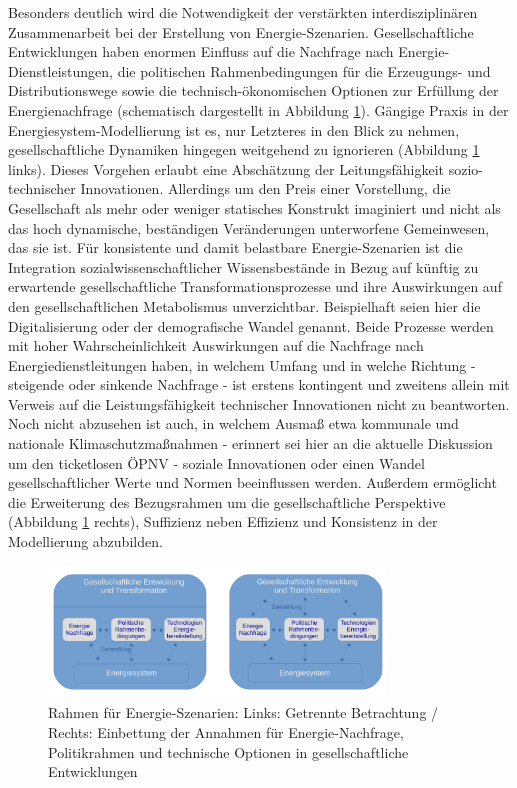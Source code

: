 \documentclass[a4paper,11pt,twoside]{scrartcl}
\begin{document}
Besonders deutlich wird die Notwendigkeit der verstärkten interdisziplinären Zusammenarbeit bei der Erstellung von Energie-Szenarien. Gesellschaftliche Entwicklungen haben enormen Einfluss auf die Nachfrage nach Energie-Dienstleistungen, die politischen Rahmenbedingungen für die Erzeugungs- und Distributionswege sowie die technisch-ökonomischen Optionen zur Erfüllung der Energienachfrage (schematisch dargestellt in Abbildung \ref{fig:szenarien}). Gängige Praxis in der Energiesystem-Modellierung ist es, nur Letzteres in den Blick zu nehmen, gesellschaftliche Dynamiken hingegen weitgehend zu ignorieren (Abbildung \ref{fig:szenarien} links). Dieses Vorgehen erlaubt eine Abschätzung der Leitungsfähigkeit sozio-technischer Innovationen. Allerdings um den Preis einer Vorstellung, die Gesellschaft als mehr oder weniger statisches Konstrukt imaginiert und nicht als das hoch dynamische, beständigen Veränderungen unterworfene Gemeinwesen, das sie ist. Für konsistente und damit belastbare Energie-Szenarien ist die Integration sozialwissenschaftlicher Wissensbestände in Bezug auf künftig zu erwartende gesellschaftliche Transformationsprozesse und ihre Auswirkungen auf den gesellschaftlichen Metabolismus unverzichtbar. Beispielhaft seien hier die Digitalisierung oder der demografische Wandel genannt. Beide Prozesse werden mit hoher Wahrscheinlichkeit Auswirkungen auf die Nachfrage nach Energiedienstleitungen haben, in welchem Umfang und in welche Richtung - steigende oder sinkende Nachfrage - ist erstens kontingent und zweitens allein mit Verweis auf die Leistungsfähigkeit technischer Innovationen nicht zu beantworten. Noch nicht abzusehen ist auch, in welchem Ausmaß etwa kommunale und nationale Klimaschutzmaßnahmen - erinnert sei hier an die aktuelle Diskussion um den ticketlosen ÖPNV - soziale Innovationen oder einen Wandel gesellschaftlicher Werte und Normen beeinflussen werden. Außerdem ermöglicht die Erweiterung des Bezugsrahmen um die gesellschaftliche Perspektive (Abbildung \ref{fig:szenarien} rechts), Suffizienz neben Effizienz und Konsistenz in der Modellierung abzubilden. 

\begin{figure}[!h]
    \centering
    \includegraphics[width=0.8\textwidth]{figures/Szenarien.pdf}
    \caption{Rahmen für Energie-Szenarien: Links: Getrennte Betrachtung / Rechts: Einbettung der Annahmen für Energie-Nachfrage, Politikrahmen und technische Optionen in gesellschaftliche Entwicklungen}
    \label{fig:szenarien}
\end{figure}
\end{document}
